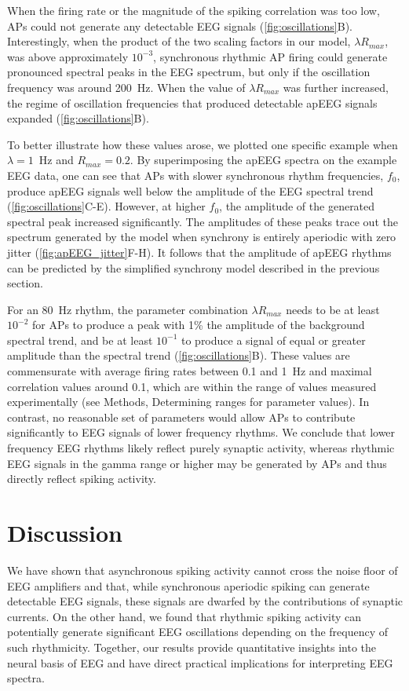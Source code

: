 When the firing rate or the magnitude of the spiking correlation was too low, APs could not generate any detectable EEG signals ({\autoref{fig:oscillations}B}). Interestingly, when the product of the two scaling factors in our model, $\lambda R_{max}$, was above approximately $10^{-3}$, synchronous rhythmic AP firing could generate pronounced spectral peaks in the EEG spectrum, but only if the oscillation frequency was around 200~\unit{\hertz}. When the value of $\lambda R_{max}$ was further increased, the regime of oscillation frequencies that produced detectable apEEG signals expanded ({\autoref{fig:oscillations}B}). 

To better illustrate how these values arose, we plotted one specific example when $\lambda=1$~\unit{\hertz} and $R_{max}=0.2$. By superimposing the apEEG spectra on the example EEG data, one can see that APs with slower synchronous rhythm frequencies, $f_0$, produce apEEG signals well below the amplitude of the EEG spectral trend ({\autoref{fig:oscillations}C-E}). However, at higher $f_0$, the amplitude of the generated spectral peak increased significantly. The amplitudes of these peaks trace out the spectrum generated by the model when synchrony is entirely aperiodic with zero jitter ({\autoref{fig:apEEG_jitter}F-H}). It follows that the amplitude of apEEG rhythms can be predicted by the simplified synchrony model described in the previous section. 

For an 80~\unit{\hertz} rhythm, the parameter combination $\lambda R_{max}$ needs to be at least $10^{-2}$ for APs to produce a peak with 1\% the amplitude of the background spectral trend, and be at least $10^{-1}$ to produce a signal of equal or greater amplitude than the spectral trend ({\autoref{fig:oscillations}B}).  These values are commensurate with average firing rates between 0.1 and 1~\unit{\hertz} and maximal correlation values around 0.1, which are within the range of values measured experimentally (see Methods, Determining ranges for parameter values). In contrast, no reasonable set of parameters would allow APs to contribute significantly to EEG signals of lower frequency rhythms. We conclude that lower frequency EEG rhythms likely reflect purely synaptic activity, whereas rhythmic EEG signals in the gamma range or higher may be generated by APs and thus directly reflect spiking activity.

\section{Discussion}
We have shown that asynchronous spiking activity cannot cross the noise floor of EEG amplifiers and that, while synchronous aperiodic spiking can generate detectable EEG signals, these signals are dwarfed by the contributions of synaptic currents. On the other hand, we found that rhythmic spiking activity can potentially generate significant EEG oscillations depending on the frequency of such rhythmicity. Together, our results provide quantitative insights into the neural basis of EEG and have direct practical implications for interpreting EEG spectra. 

